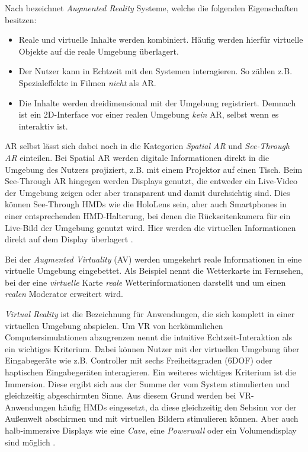 Nach \textcite{Azuma1997} bezeichnet \emph{Augmented Reality} Systeme, welche die folgenden Eigenschaften besitzen:
\begin{itemize}
    \item Reale und virtuelle Inhalte werden kombiniert. Häufig werden hierfür virtuelle Objekte auf die reale Umgebung überlagert.
    \item Der Nutzer kann in Echtzeit mit den Systemen interagieren. So zählen z.B. Spezialeffekte in Filmen \emph{nicht} als AR.
    \item Die Inhalte werden dreidimensional mit der Umgebung registriert. Demnach ist ein 2D-Interface vor einer realen Umgebung \emph{kein} AR, selbst wenn es interaktiv ist.
\end{itemize}
AR selbst lässt sich dabei noch in die Kategorien \emph{Spatial AR} und \emph{See-Through AR} einteilen.
Bei Spatial AR werden digitale Informationen direkt in die Umgebung des Nutzers projiziert, z.B. mit einem Projektor auf einen Tisch.
Beim See-Through AR hingegen werden Displays genutzt, die entweder ein Live-Video der Umgebung zeigen oder aber transparent und damit durchsichtig sind.
Dies können See-Through HMDs wie die HoloLens sein, aber auch Smartphones in einer entsprechenden HMD-Halterung, bei denen die Rückseitenkamera für ein Live-Bild der Umgebung genutzt wird.
Hier werden die virtuellen Informationen direkt auf dem Display überlagert \autocite{Zachmann2015}.

Bei der \emph{Augmented Virtuality} (AV) werden umgekehrt reale Informationen in eine virtuelle Umgebung eingebettet.
Als Beispiel nennt \textcite[6]{Schroeder2017} die Wetterkarte im Fernsehen, bei der eine \emph{virtuelle} Karte \emph{reale} Wetterinformationen darstellt und um einen \emph{realen} Moderator erweitert wird.

\emph{Virtual Reality} ist die Bezeichnung für Anwendungen, die sich komplett in einer virtuellen Umgebung abspielen.
Um VR von herkömmlichen Computersimulationen abzugrenzen nennt \textcite{Zachmann2015} die intuitive Echtzeit-Interaktion als ein wichtiges Kriterium.
Dabei können Nutzer mit der virtuellen Umgebung über Eingabegeräte wie z.B. Controller mit sechs Freiheitsgraden (6DOF) oder haptischen Eingabegeräten interagieren.
Ein weiteres wichtiges Kriterium ist die Immersion.
Diese ergibt sich aus der Summe der vom System stimulierten und gleichzeitig abgeschirmten Sinne.
Aus diesem Grund werden bei VR-Anwendungen häufig HMDs eingesetzt, da diese gleichzeitig den Sehsinn vor der Außenwelt abschirmen und mit virtuellen Bildern stimulieren können.
Aber auch halb-immersive Displays wie eine \emph{Cave}, eine \emph{Powerwall} oder ein Volumendisplay sind möglich \parencite{Zachmann2015b}.

